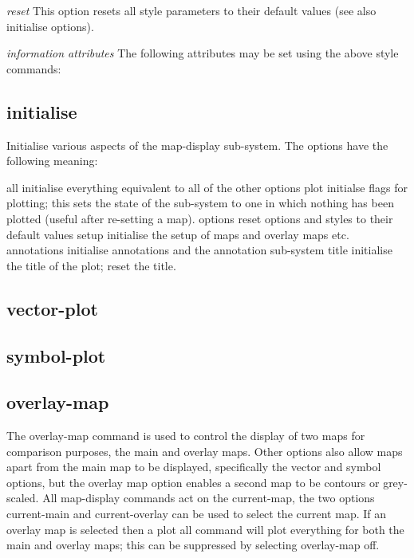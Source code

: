 {\em reset}
\newline
This option resets all style parameters to their default values (see also
initialise options).

{\em information attributes}
\newline
The following attributes may be set using the above style commands:

\subsection{initialise}

Initialise various aspects of the map-display sub-system.  The options
have the following meaning:

      all            initialise everything equivalent to all of the
                     other options
      plot           initialse flags for plotting; this sets the state
                     of the sub-system to one in which nothing has been
                     plotted (useful after re-setting a map).
      options        reset options and styles to their default values
      setup          initialise the setup of maps and overlay maps etc.
      annotations    initialise annotations and the annotation sub-system
      title          initialise the title of the plot; reset the title.

\subsection{vector-plot}


\subsection{symbol-plot}

\subsection{overlay-map}

The overlay-map command is used to control the display of two maps
for comparison purposes, the main and overlay maps.  Other options
also allow maps apart from the main map to be displayed, specifically
the vector and symbol options, but the overlay map option enables a
second map to be contours or grey-scaled.  All map-display commands
act on the current-map, the two options current-main and current-overlay
can be used to select the current map.   If an overlay map is selected
then a plot all command will plot everything for both the main and
overlay maps; this can be suppressed by selecting overlay-map off.

